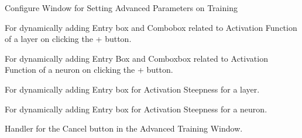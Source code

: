 \documentclass[letterpaper,10pt,english]{sphinxmanual}
\begin{document}
\begin{fulllineitems}
\label{index:adv_train.adv_train}
Configure Window for Setting Advanced Parameters on Training


\begin{fulllineitems}
\label{index:adv_train.adv_train.on_add_afl}
For dynamically adding Entry box and Combobox related to Activation
Function of a layer on clicking the + button.

\end{fulllineitems}



\begin{fulllineitems}
\label{index:adv_train.adv_train.on_add_afn}
For dynamically adding Entry Box and Comboxbox
related to Activation Function of a neuron on clicking the + button.

\end{fulllineitems}



\begin{fulllineitems}
\label{index:adv_train.adv_train.on_add_asl}
For dynamically adding Entry box for Activation Steepness for
a layer.

\end{fulllineitems}



\begin{fulllineitems}
\label{index:adv_train.adv_train.on_add_asn}
For dynamically adding Entry box for Activation Steepness for
a neuron.

\end{fulllineitems}



\begin{fulllineitems}
\label{index:adv_train.adv_train.on_cancel}
Handler for the Cancel button in the Advanced Training Window.


\end{fulllineitems}
\end{fulllineitems}
\end{document}
